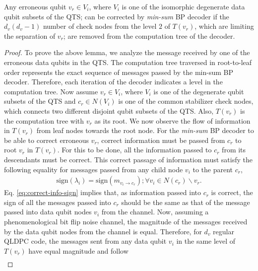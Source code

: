 \documentclass[10pt,a4paper]{amsart}
\begin{document}
\begin{lemma}
    Any erroneous qubit $v_r \in V_i$, where $V_i$ is one of the isomorphic degenerate data qubit subsets of the QTS; can be corrected by \textit{min-sum} BP decoder if the $d_v(d_v-1)$ number of check nodes from the level $2$ of $T(v_r)$, which are limiting the separation of $v_r$; are removed from the computation tree of the decoder.
    \label{cor:sep-imp-rem-chk}
\end{lemma}

\begin{proof}
    To prove the above lemma, we analyze the message received by one of the erroneous data qubits in the QTS.
    The computation tree traversed in root-to-leaf order represents the exact sequence of messages passed by the min-sum BP decoder.
    Therefore, each iteration of the decoder indicates a level in the computation tree.
    Now assume $v_r \in V_i$, where $V_i$ is one of the degenerate qubit subsets of the QTS and $c_r \in N(V_i)$ is one of the common stabilizer check nodes, which connects two different disjoint qubit subsets of the QTS.
    Also, $T(v_r)$ is the computation tree with $v_r$ as its root.
    We now observe the flow of information in $T(v_r)$ from leaf nodes towards the root node.
    For the \textit{min-sum} BP decoder to be able to correct erroneous $v_r$, correct information must be passed from $c_r$ to root $v_r$ in $T(v_r)$.
    For this to be done, all the information passed to $c_r$ from its descendants must be correct.
    This correct passage of information must satisfy the following equality for messages passed from any child node $v_i$ to the parent $c_r$,
    \begin{align}
        \mathrm{sign}(\lambda_i) = \mathrm{sign}(m_{v_i \rightarrow c_r}); \forall v_i \in N(c_r)\backslash v_r.
        \label{eq:correct-info-sign}
    \end{align}
    Eq. \eqref{eq:correct-info-sign} implies that, as information passed into $c_r$ is correct, the sign of all the messages passed into $c_r$ should be the same as that of the message passed into data qubit nodes $v_i$ from the channel.
    Now, assuming a phenomenological bit flip noise channel, the magnitude of the messages received by the data qubit nodes from the channel is equal.
    Therefore, for $d_v$ regular QLDPC code, the messages sent from any data qubit $v_i$ in the same level of $T(v_r)$ have equal magnitude and follow
    \begin{align}

\end{align}
\end{proof}
\end{document}
